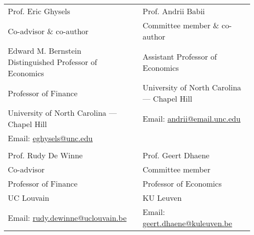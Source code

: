 \documentclass[10pt]{article}
\begin{document}
	\vspace{-0.5em}
	\vspace{-1em}
	\begin{table}[!h]
		\begin{tabular}{l p{0.1cm} l}
			Prof. Eric Ghysels & &Prof. Andrii Babii  \\
			Co-advisor \& co-author && Committee member \& co-author \\
			Edward M. Bernstein Distinguished Professor
			of Economics & &Assistant Professor of Economics  \\
			Professor of Finance & &University of North Carolina --- Chapel Hill  \\
			University of North Carolina --- Chapel Hill & &Email: \href{mailto:andrii@email.unc.edu}{andrii@email.unc.edu} \\
			Email: \href{mailto:eghysels@unc.edu}{eghysels@unc.edu} & &\\
			& &\\
			Prof. Rudy De Winne & &Prof. Geert Dhaene  \\
			Co-advisor & &Committee member \\
			Professor of Finance & &Professor of Economics  \\
			UC Louvain && KU Leuven \\
			Email: \href{mailto:rudy.dewinne@uclouvain.beu}{rudy.dewinne@uclouvain.be}& &Email: \href{mailto:geert.dhaene@kuleuven.be}{geert.dhaene@kuleuven.be} \\
		\end{tabular}
	\end{table}
	
	
	
\end{document}
